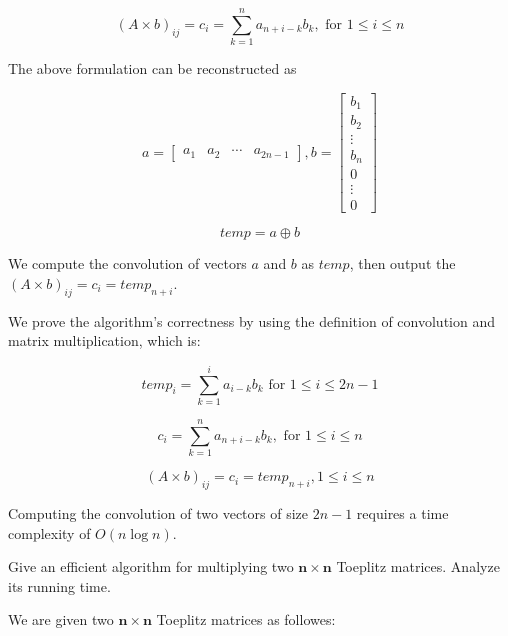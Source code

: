 $$(A\times b)_{i j}=c_{i} = \sum_{k=1}^{n}{a_{n+i-k}b_{k}},  \text { for }1\leq i \leq n$$

The above formulation can be reconstructed as 

$$a=\begin{bmatrix} a_1& a_2 & \cdots & a_{2n-1} \end{bmatrix}, b=\begin{bmatrix} b_1\\ b_2 \\ \vdots \\b_{n} \\ 0 \\ \vdots \\ 0 \end{bmatrix}$$

$$temp = a \oplus b$$

We compute the convolution of vectors $a$ and $b$ as $temp$, then output the $(A\times b)_{i j}=c_{i} =temp_{n+i}$.


We prove the algorithm's correctness by using the definition of convolution and matrix multiplication, which is:

$$temp_{i} = \sum_{k=1}^{i} a_{i-k} b_{k} \text { for } 1 \leq i \leq 2n-1$$

$$c_{i} = \sum_{k=1}^{n}{a_{n+i-k}b_{k}}, \text { for } 1\leq i \leq n$$

$$(A\times b)_{i j}=c_{i} =temp_{n+i}, 1\le i \le n$$


Computing the convolution of two vectors of size $2n-1$ requires a time complexity of $O(n \log n)$.




Give an efficient algorithm for multiplying two $\boldsymbol{n} \times \boldsymbol{n}$ Toeplitz matrices. Analyze its running time.

\solution


We are given two $\boldsymbol{n} \times \boldsymbol{n}$ Toeplitz matrices as followes:

